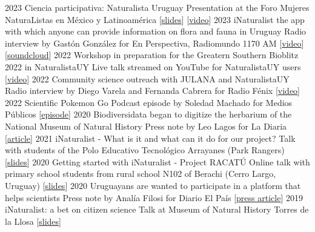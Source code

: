 \documentclass[9pt]{developercv} %
\begin{document}
\begin{entrylist}
		{2023}
		{Ciencia participativa: Naturalista Uruguay}
		{}
		{Presentation at the Foro Mujeres NaturaListas en México y Latinoamérica [\href{https://flograttarola.com/talk/ciencia-participativa-y-naturalista-uruguay/Foro_mujeres_Mexico_y_Latam.pdf}{slides}] [\href{https://fb.watch/iBdjBHYFQm/}{video}]}
	\entrylong
		{2023}
		{iNaturalist the app with which anyone can provide information on flora and fauna in Uruguay}
		{}
		{Radio interview by Gastón González for En Perspectiva, Radiomundo 1170 AM [\href{https://youtu.be/TcYk9ZquyvE}{video}] [\href{https://soundcloud.com/en-perspectiva-uy/entrevista-florencia-grattarola-naturalistauy-te-invita-a-realizar-ciencia-ciudadana}{soundcloud}]}
	\entrylong
		{2022}
		{Workshop in preparation for the Greatern Southern Bioblitz 2022 in NaturalistaUY}
		{}
		{Live talk streamed on YouTube for NaturalistaUY users [\href{https://youtu.be/sPKhUy3CJQ0}{video}]}
	\entrylong
		{2022}
		{Community science outreach with JULANA and NaturalistaUY}
		{}
		{Radio interview by Diego Varela and Fernanda Cabrera for Radio Fénix [\href{https://youtu.be/Scc01vg1PTs}{video}]}
	\entrylong
		{2022}
		{Scientific Pokemon Go}
		{}
		{Podcast episode by Soledad Machado for Medios Públicos [\href{https://open.spotify.com/episode/05X1u40HyvvTjuuYKjyJE2?si=jCNZ8hHmQ8S-CSfiNOCryQ}{episode}]}
	\entrylong
		{2020}
		{Biodiversidata began to digitize the herbarium of the National Museum of Natural History}
		{}
		{Press note by Leo Lagos for La Diaria [\href{https://ladiaria.com.uy/ciencia/articulo/2020/2/biodiversidata-comenzo-a-digitalizar-el-herbario-del-museo-nacional-de-historia-natural/}{article}]}
	\entrylong
		{2021}
		{iNaturalist - What is it and what can it do for our project?}
		{}
		{Talk with students of the Polo Educativo Tecnológico Arrayanes (Park Rangers) [\href{https://flograttarola.com/pdf/Arrayanes_iNatUY.pdf}{slides}]}
	\entrylong
		{2020}
		{Getting started with iNaturalist - Project RACATÚ}
		{}
		{Online talk with primary school students from rural school N102 of Berachi (Cerro Largo, Uruguay) [\href{https://flograttarola.com/pdf/iNat_Berachi.pdf}{slides}]}
	\entrylong
		{2020}
		{Uruguayans are wanted to participate in a platform that helps scientists}
		{}
		{Press note by Analía Filosi for Diario El País [\href{https://www.elpais.com.uy/vida-actual/busca-uruguayos-participen-plataforma-ayuda-cientificos.html}{press article}]}
	\entrylong
		{2019}
		{iNaturalist: a bet on citizen science}
		{}
		{Talk at Museum of Natural History Torres de la Llosa [\href{https://flograttarola.com/pdf/NaturalistaUy.pdf}{slides}]}
	\entrylong

\end{entrylist}
\end{document}
